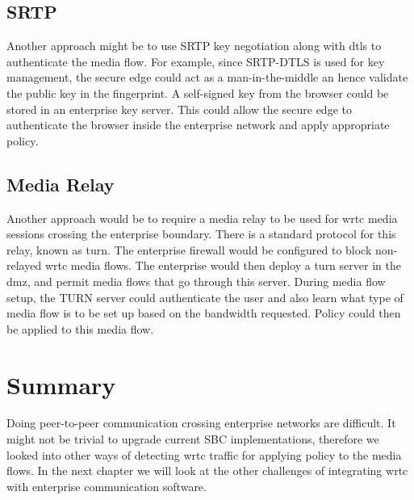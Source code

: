 \subsection{SRTP}
Another approach might be to use SRTP key negotiation along with \gls{dtls} to authenticate the media flow. For example, since SRTP-DTLS is used for key management, the secure edge could act as a man-in-the-middle an hence validate the public key in the fingerprint. A self-signed key from the browser could be stored in an enterprise key server. This could allow the secure edge to authenticate the browser inside the enterprise network and apply appropriate policy.

\subsection{Media Relay}
Another approach would be to require a media relay to be used for \gls{wrtc} media sessions crossing the enterprise boundary. There is a standard protocol for this relay, known as \gls{turn}. The enterprise firewall would be configured to block non-relayed \gls{wrtc} media flows. The enterprise would then deploy a \gls{turn} server in the \gls{dmz}, and permit media flows that go through this server. During media flow setup, the TURN server could authenticate the user and also learn what type of media flow is to be set up based on the bandwidth requested. Policy could then be applied to this media flow.

\section{Summary}
Doing peer-to-peer communication crossing enterprise networks are difficult. It might not be trivial to upgrade current SBC implementations, therefore we looked into other ways of detecting \gls{wrtc} traffic for applying policy to the media flows. In the next chapter we will look at the other challenges of integrating \gls{wrtc} with enterprise communication software. 
